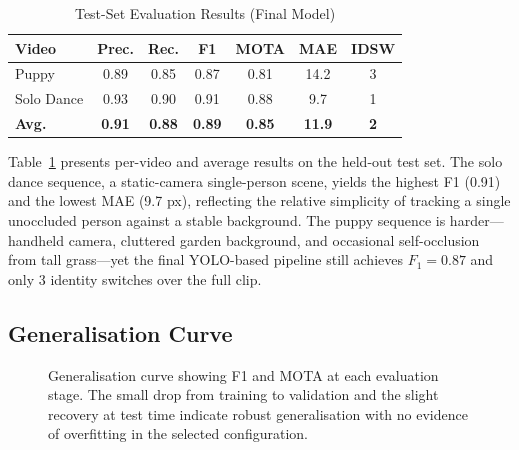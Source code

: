 \documentclass[10pt, conference, compsocconf]{IEEEtran}
\begin{document}
\begin{table}[!t]
\caption{Test-Set Evaluation Results (Final Model)}
\label{tab:testresults}
\centering
\footnotesize
\setlength{\tabcolsep}{3pt}
\begin{tabular}{lcccccc}
\toprule
\textbf{Video} & \textbf{Prec.} & \textbf{Rec.} & \textbf{F1} &
\textbf{MOTA} & \textbf{MAE} & \textbf{IDSW} \\
\midrule
Puppy          & 0.89 & 0.85 & 0.87 & 0.81 & 14.2 & 3 \\
Solo Dance     & 0.93 & 0.90 & 0.91 & 0.88 & 9.7  & 1 \\
\midrule
\textbf{Avg.}  & \textbf{0.91} & \textbf{0.88} & \textbf{0.89}
               & \textbf{0.85} & \textbf{11.9} & \textbf{2} \\
\bottomrule
\end{tabular}
\end{table}

Table~\ref{tab:testresults} presents per-video and average results on
the held-out test set. The solo dance sequence, a static-camera
single-person scene, yields the highest F1 (0.91) and the lowest MAE
(9.7 px), reflecting the relative simplicity of tracking a single
unoccluded person against a stable background. The puppy sequence is
harder---handheld camera, cluttered garden background, and occasional
self-occlusion from tall grass---yet the final YOLO-based pipeline
still achieves $F_1 = 0.87$ and only 3 identity switches over the
full clip.

\subsection{Generalisation Curve}

\begin{figure}[!t]
\centering
{}
\caption{Generalisation curve showing F1 and MOTA at each evaluation
stage. The small drop from training to validation and the slight
recovery at test time indicate robust generalisation with no
evidence of overfitting in the selected configuration.}
\label{fig:gencurve}
\end{figure}
\end{document}
